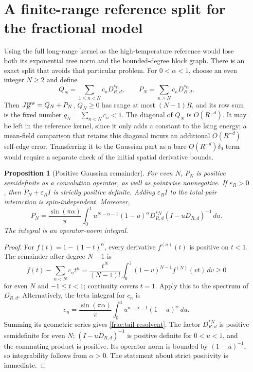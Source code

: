 \documentclass[11pt]{article}
\newtheorem{proposition}{Proposition}[section]
\begin{document}
\section{A finite-range reference split for the fractional model}
\label{frac:split}

Using the full long-range kernel as the high-temperature reference
would lose both its exponential tree norm and the bounded-degree
block graph. There is an exact split that avoids that particular
problem. For \(0<\alpha<1\), choose an even integer \(N\ge2\)
and define
\[
 Q_N=\sum_{1\le n<N}c_nD_{R,d}^{*n},\qquad
 P_N=\sum_{n\ge N}c_nD_{R,d}^{*n}.
\]
Then \(J_R^{\rm raw}=Q_N+P_N\), \(Q_N\ge0\) has range at most
\((N-1)R\), and its row sum is the fixed number
\(q_N=\sum_{n<N}c_n<1\). The diagonal of \(Q_N\) is
\(O(R^{-d})\). It may be left in the reference kernel, since it
only adds a constant to the Ising energy; a mean-field comparison
that retains this diagonal incurs an additional \(O(R^{-d})\)
self-edge error. Transferring it to the Gaussian part as a bare
\(O(R^{-d})\delta_0\) term would require a separate check of the
initial spatial derivative bounds.

\begin{proposition}[Positive Gaussian remainder]
\label{frac:positive-tail}
For even \(N\), \(P_N\) is positive semidefinite as a convolution
operator, as well as pointwise nonnegative. If
\(\varepsilon_R>0\), then \(P_N+\varepsilon_R I\) is strictly
positive definite. Adding \(\varepsilon_R I\) to the total pair
interaction is spin-independent. Moreover,
\begin{equation}\label{frac:tail-resolvent}
 P_N=\frac{\sin(\pi\alpha)}\pi
   \int_0^1 u^{N-\alpha-1}(1-u)^\alpha
              D_{R,d}^{*N}(I-uD_{R,d})^{-1}\,du.
\end{equation}
The integral is an operator-norm integral.
\end{proposition}

\begin{proof}
For \(f(t)=1-(1-t)^\alpha\), every derivative \(f^{(n)}(t)\)
is positive on \(t<1\). The remainder after degree \(N-1\) is
\[
 f(t)-\sum_{n<N}c_nt^n
 =\frac{t^N}{(N-1)!}
       \int_0^1(1-v)^{N-1}f^{(N)}(vt)\,dv\ge0
\]
for even \(N\) and \(-1\le t<1\); continuity covers \(t=1\).
Apply this to the spectrum of \(D_{R,d}\). Alternatively, the
beta integral for \(c_n\) is
\[
 c_n=\frac{\sin(\pi\alpha)}\pi
       \int_0^1u^{n-\alpha-1}(1-u)^\alpha\,du.
\]
Summing its geometric series gives \eqref{frac:tail-resolvent}.
The factor \(D_{R,d}^{*N}\) is positive semidefinite for even
\(N\); \((I-uD_{R,d})^{-1}\) is positive definite for
\(0<u<1\), and the commuting product is positive. Its operator
norm is bounded by \((1-u)^{-1}\), so integrability follows
from \(\alpha>0\). The statement about strict positivity is
immediate.
\end{proof}
\end{document}
